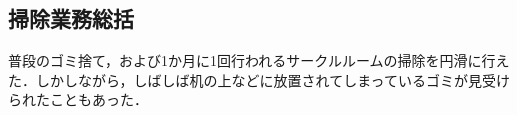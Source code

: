 \subsection*{掃除業務総括}

普段のゴミ捨て，および1か月に1回行われるサークルルームの掃除を円滑に行えた．しかしながら，しばしば机の上などに放置されてしまっているゴミが見受けられたこともあった．
